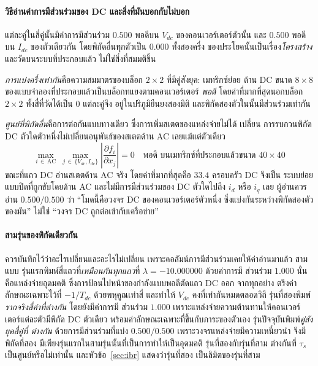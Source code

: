 \documentclass[12pt,a4paper]{article}
\begin{document}
\paragraph{วิธีอ่านค่าการมีส่วนร่วมของ DC และสิ่งที่มันบอกกับไม่บอก}
แต่ละคู่ในสี่คู่นั้นมีค่าการมีส่วนร่วม $0.500$ พอดีบน $V_{dc}$ ของคอนเวอร์เตอร์ตัวนั้น
และ $0.500$ พอดีบน $I_{dc}$ ของตัวเดียวกัน โดยพิกัดอื่นทุกตัวเป็น $0.000$ ทั้งสองครึ่ง
ของประโยคนั้นเป็นเรื่อง\emph{โครงสร้าง} และวัดบนระบบที่ประกอบแล้ว ไม่ใช่สิ่งที่สมมติขึ้น

\emph{การแบ่งครึ่งเท่ากัน}คือความสมมาตรของบล็อก $2\times2$ ที่มีคู่สังยุค: เมทริกซ์ย่อย
ด้าน DC ขนาด $8\times8$ ของแบบจำลองที่ประกอบแล้วเป็นบล็อกทแยงตามคอนเวอร์เตอร์
\emph{พอดี} โดยค่าที่มากที่สุดนอกบล็อก $2\times2$ ทั้งสี่ที่วัดได้เป็น $0$ แต่ละคู่จึง
อยู่ในปริภูมิยืนยงสองมิติ และพิกัดสองตัวในนั้นมีส่วนร่วมเท่ากัน

\emph{ศูนย์ที่พิกัดอื่น}คือการต่อกันแบบทางเดียว ซึ่งการเพิ่มสเตตของแหล่งจ่ายไม่ได้
เปลี่ยน การรบกวนพิกัด DC ตัวใดตัวหนึ่งไม่เปลี่ยนอนุพันธ์ของสเตตด้าน AC เลยแม้แต่ตัวเดียว
\begin{equation}
  \max_{i\,\in\,\mathrm{AC}}\ \max_{j\,\in\,\{V_{dc},I_{dc}\}}
  \left|\frac{\partial f_i}{\partial x_j}\right| = 0
  \quad\text{พอดี บนเมทริกซ์ที่ประกอบแล้วขนาด } 40\times40
  \label{eq:oneway}
\end{equation}
ขณะที่แถว DC อ่านสเตตด้าน AC จริง โดยค่าที่มากที่สุดคือ $33.4$ ครอบครัว DC จึงเป็น
ระบบย่อยแบบปิดที่ถูกขับโดยด้าน AC และไม่มีการมีส่วนร่วมของ DC ตัวใดไปถึง $i_d$ หรือ
$i_q$ เลย ผู้อ่านควรอ่าน $0.500/0.500$ ว่า ``โมดนี้คือวงจร DC ของคอนเวอร์เตอร์ตัวหนึ่ง
ซึ่งแบ่งกันระหว่างพิกัดสองตัวของมัน'' ไม่ใช่ ``วงจร DC ถูกต่อเข้ากับเครือข่าย''

\paragraph{สามรุ่นของพิกัดเดียวกัน}
ควรบันทึกไว้ว่าอะไรเปลี่ยนและอะไรไม่เปลี่ยน เพราะคอลัมน์การมีส่วนร่วมเคยให้ค่าอ่านมาแล้ว
สามแบบ รุ่นแรกพิมพ์สี่แถวที่\emph{เหมือนกันทุกแถว}ที่ $\lambda=-10.000000$ ด้วยค่าการมี
ส่วนร่วม $1.000$ นั่นคือแหล่งจ่ายอุดมคติ ซึ่งการป้อนไปหน้าของกำลังแบบพอดีตัดแถว DC ออก
จากทุกอย่าง ตรึงค่าลักษณะเฉพาะไว้ที่ $-1/T_{dc}$ ด้วยพหุคูณเท่าสี่ และทำให้ $V_{dc}$
คงที่เท่ากันหมดตลอดวิถี รุ่นที่สองพิมพ์\emph{รากจริงสี่ค่าที่ต่างกัน} โดยยังมีค่าการมี
ส่วนร่วม $1.000$ เพราะแหล่งจ่ายความต้านทานให้คอนเวอร์เตอร์แต่ละตัวมีพิกัด DC ตัวเดียว
พร้อมค่าลักษณะเฉพาะที่ขึ้นกับภาระของตัวเอง รุ่นปัจจุบันพิมพ์\emph{คู่สังยุคสี่คู่ที่
ต่างกัน} ด้วยการมีส่วนร่วมที่แบ่ง $0.500/0.500$ เพราะวงจรแหล่งจ่ายมีความเหนี่ยวนำ จึงมี
พิกัดที่สอง มีเพียงรุ่นแรกในสามรุ่นนั้นที่เป็นการทำให้เป็นอุดมคติ รุ่นที่สองกับรุ่นที่สาม
ต่างกันที่ $\tau_s$ เป็นศูนย์หรือไม่เท่านั้น และหัวข้อ~\ref{sec:ibr} แสดงว่ารุ่นที่สอง
เป็นลิมิตของรุ่นที่สาม
\end{document}

